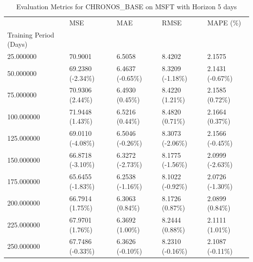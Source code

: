 \begin{table}
\caption{Evaluation Metrics for CHRONOS_BASE on MSFT with Horizon 5 days}
\label{tab:chronos_base_MSFT_h5_metrics}
\begin{tabular}{lllll}
\toprule
 & MSE & MAE & RMSE & MAPE (\%) \\
Training Period (Days) &  &  &  &  \\
\midrule
25.000000 & 70.9001 & 6.5058 & 8.4202 & 2.1575 \\
50.000000 & 69.2380 (-2.34\%) & 6.4637 (-0.65\%) & 8.3209 (-1.18\%) & 2.1431 (-0.67\%) \\
75.000000 & 70.9306 (2.44\%) & 6.4930 (0.45\%) & 8.4220 (1.21\%) & 2.1585 (0.72\%) \\
100.000000 & 71.9448 (1.43\%) & 6.5216 (0.44\%) & 8.4820 (0.71\%) & 2.1664 (0.37\%) \\
125.000000 & 69.0110 (-4.08\%) & 6.5046 (-0.26\%) & 8.3073 (-2.06\%) & 2.1566 (-0.45\%) \\
150.000000 & 66.8718 (-3.10\%) & 6.3272 (-2.73\%) & 8.1775 (-1.56\%) & 2.0999 (-2.63\%) \\
175.000000 & 65.6455 (-1.83\%) & 6.2538 (-1.16\%) & 8.1022 (-0.92\%) & 2.0726 (-1.30\%) \\
200.000000 & 66.7914 (1.75\%) & 6.3063 (0.84\%) & 8.1726 (0.87\%) & 2.0899 (0.84\%) \\
225.000000 & 67.9701 (1.76\%) & 6.3692 (1.00\%) & 8.2444 (0.88\%) & 2.1111 (1.01\%) \\
250.000000 & 67.7486 (-0.33\%) & 6.3626 (-0.10\%) & 8.2310 (-0.16\%) & 2.1087 (-0.11\%) \\
\bottomrule
\end{tabular}
\end{table}
